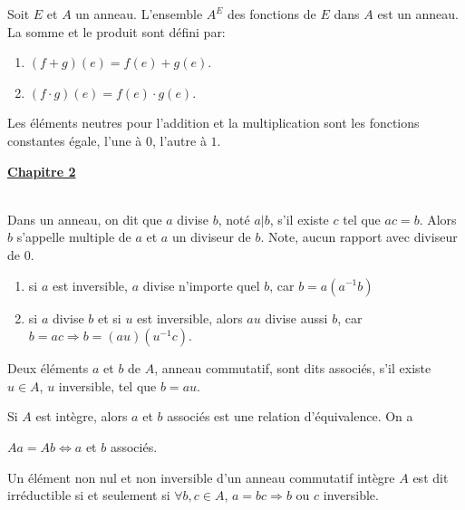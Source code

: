 \documentclass[12pt,a4paper]{article}
\begin{document}
\begin{flushleft}
\begin{prop}
Soit $E$ et $A$ un anneau. L'ensemble $A^E$ des fonctions de $E$ dans $A$ est un anneau. La somme et le produit sont défini par: 
\begin{enumerate}
\item $(f+g)(e)= f(e) + g(e)$.
\item $(f \cdot g) (e) = f(e) \cdot g(e)$.
\end{enumerate}
Les éléments neutres pour l'addition et la multiplication sont les fonctions constantes égale, l'une à $0$, l'autre à $1$. 
\end{prop}


\textbf{\underline{Chapitre 2}}\\~\\

\begin{mydef}
Dans un anneau, on dit que $a$ divise $ b $, noté $ a | b $, s'il existe $ c $ tel que $ ac = b $. Alors $ b $ s'appelle multiple de $ a $ et $ a $ un diviseur de  $b $. Note, aucun rapport avec diviseur de $ 0 $.
\end{mydef}

\begin{rem}
\begin{enumerate}
\item si $ a $ est inversible, $ a $ divise n'importe quel $ b $, car $ b = a (a^{-1} b) $
\item si $ a $ divise $ b $ et si $ u $ est inversible, alors $ au $ divise aussi $ b $, car $b = ac \Rightarrow b = (au) (u^{-1} c)$.
\end{enumerate}
\end{rem}

\begin{mydef}
Deux éléments $a$ et $b$ de $A$, anneau commutatif, sont dits associés, s'il existe $u \in A$, $u$ inversible, tel que $ b = au$.
\end{mydef}

\begin{prop}
Si $A$ est intègre, alors $a$ et $b$ associés est une relation d'équivalence. On a\\
\begin{center}
$Aa = Ab \Leftrightarrow a $ et $b$ associés.
\end{center}
\end{prop}

\begin{mydef}
Un élément non nul et non inversible d'un anneau commutatif intègre $A$ est dit irréductible si et seulement si  $\forall b , c \in A$, $a = bc \Rightarrow b $ ou $c$ inversible.
\end{mydef}


\end{flushleft}
\end{document}
